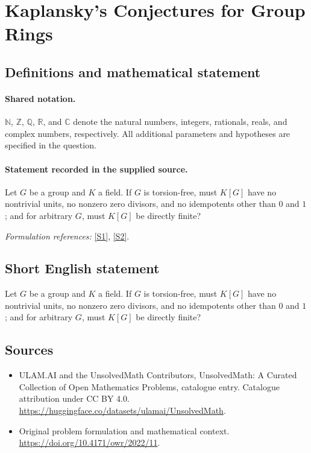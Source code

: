 \documentclass[11pt]{article}
\newcommand{\sref}[2]{\hyperlink{source:#1:#2}{[S#2]}}
\begin{document}
\section{Kaplansky's Conjectures for Group Rings}\label{statement}

\subsection{Definitions and mathematical statement}

\paragraph{Shared notation.}$\mathbb N$, $\mathbb Z$, $\mathbb Q$, $\mathbb R$, and $\mathbb C$ denote the natural numbers, integers, rationals, reals, and complex numbers, respectively. All additional parameters and hypotheses are specified in the question.


\paragraph{Statement recorded in the supplied source.}
Let $G$ be a group and $K$ a field. If $G$ is torsion-free, must $K[G]$ have no nontrivial units, no nonzero zero divisors, and no idempotents other than $0$ and $1$; and for arbitrary $G$, must $K[G]$ be directly finite?
\par\smallskip\textit{Formulation references:} \sref{statement}{1}, \sref{statement}{2}.
\subsection{Short English statement}
Let $G$ be a group and $K$ a field. If $G$ is torsion-free, must $K[G]$ have no nontrivial units, no nonzero zero divisors, and no idempotents other than $0$ and $1$; and for arbitrary $G$, must $K[G]$ be directly finite?
\subsection{Sources}
\begin{itemize}
\item[\hypertarget{source:statement:1}{S1}] ULAM.AI and the UnsolvedMath Contributors, UnsolvedMath: A Curated Collection of Open Mathematics Problems, catalogue entry. Catalogue attribution under CC BY 4.0.
\url{https://huggingface.co/datasets/ulamai/UnsolvedMath}.
\item[\hypertarget{source:statement:2}{S2}] Original problem formulation and mathematical context.
\url{https://doi.org/10.4171/owr/2022/11}.
\end{itemize}
\label{end:statement}
\end{document}
